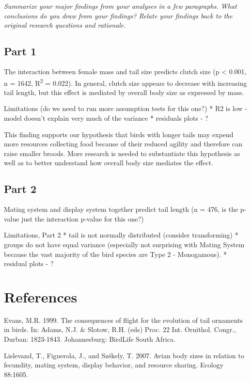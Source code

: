\documentclass[
  12pt,
]{article}
\begin{document}
\emph{Summarize your major findings from your analyses in a few
paragraphs. What conclusions do you draw from your findings? Relate your
findings back to the original research questions and rationale.}

\hypertarget{part-1}{%
\subsection{Part 1}\label{part-1}}

The interaction between female mass and tail size predicts clutch size
(p \textless{} 0.001, n = 1642, R\textsuperscript{2} = 0.022). In
general, clutch size appears to decrease with increasing tail length,
but this effect is mediated by overall body size as expressed by mass.

Limitations (do we need to run more assumption tests for this one?) * R2
is low - model doesn't explain very much of the variance * residuals
plots - ?

This finding supports our hypothesis that birds with longer tails may
expend more resources collecting food because of their reduced agility
and therefore can raise smaller broods. More research is needed to
substantiate this hypothesis as well as to better understand how overall
body size mediates the effect.

\hypertarget{part-2}{%
\subsection{Part 2}\label{part-2}}

Mating system and display system together predict tail length (n = 476,
is the p-value just the interaction p-value for this one?)

Limitations, Part 2 * tail is not normally distributed (consider
transforming) * groups do not have equal variance (especially not
surprising with Mating System because the vast majority of the bird
species are Type 2 - Monogamous). * residual plots - ?

\newpage

\hypertarget{references}{%
\section{References}\label{references}}

Evans, M.R. 1999. The consequences of flight for the evolution of tail
ornaments in birds. In: Adams, N.J. \& Slotow, R.H. (eds) Proc. 22 Int.
Ornithol. Congr., Durban: 1823-1843. Johannesburg: BirdLife South
Africa.

Lislevand, T., Figuerola, J., and Székely, T. 2007. Avian body sizes in
relation to fecundity, mating system, display behavior, and resource
sharing. Ecology 88:1605.
\end{document}
